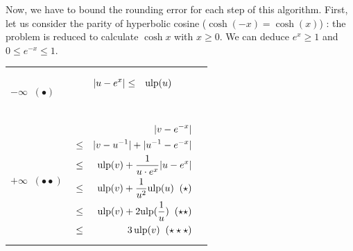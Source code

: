 \documentclass[12pt]{amsart}
\def\ulp{{\rm ulp}}
\begin{document}
Now, we have to bound the rounding error for each step of this
algorithm.  First, let us consider the parity of hyperbolic cosine
($\cosh(-x)=\cosh(x)$) : the problem is reduced to calculate $\cosh x$
with $x \geq 0$. We can deduce $e^x \geq 1$ and $0 \leq e^{-x} \leq
1$.



\begin{center}
\begin{tabular}{l l l}

\begin{minipage}{2.5cm}


${\textnormal{error}}(u)$


$u \leftarrow \circ(e^x)$\\
$-\infty \;\; (\bullet)$

\end{minipage} &
\begin{minipage}{7.5cm}

\begin{eqnarray}\nonumber
  |u-e^x| &\leq& \ulp(u)\\\nonumber
\end{eqnarray}

\end{minipage} &
\begin{minipage}{6cm}
{\hspace{7cm}}
\end{minipage}\\%
\begin{minipage}{2.5cm}
${\textnormal{error}}(v)$


$v \leftarrow \circ({u}^{-1}) $\\
$+\infty \;\; (\bullet\bullet)$
\end{minipage} &
\begin{minipage}{7.5cm}



\begin{eqnarray}\nonumber
  &&|v-e^{-x}| \\\nonumber
  &       \leq&  |v - u^{-1}| +  |u^{-1}  - e^{-x}|\\\nonumber
  &       \leq& \ulp(v) + \frac{1}{u \cdot e^x} |u-e^{x}|\\\nonumber
  &       \leq& \ulp(v) + \frac{1}{u^2} \ulp(u)\;\;(\star)\\\nonumber
  &       \leq& \ulp(v) + 2 \ulp(\frac{1}{u})\;\;(\star\star)\\\nonumber
  &       \leq& 3 \, \ulp(v)\;\;(\star\star\star)
\end{eqnarray}



\end{minipage}
\end{tabular}
\end{center}
\end{document}
